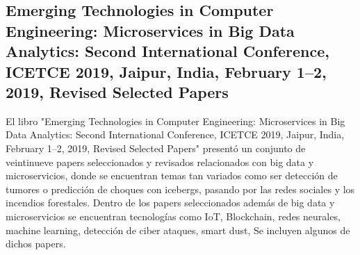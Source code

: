 \subsection{Emerging Technologies in Computer Engineering: Microservices in Big Data Analytics: Second International Conference, {ICETCE} 2019, Jaipur, India, February 1–2, 2019, Revised Selected Papers
}

El libro "Emerging Technologies in Computer Engineering: Microservices in Big Data Analytics: Second International Conference, {ICETCE} 2019, Jaipur, India, February 1–2, 2019, Revised Selected Papers"\cite{somaniEmerging2019} presentó un conjunto de veintinueve papers seleccionados y revisados relacionados con big data y microservicios,
donde se encuentran temas tan variados como ser detección de tumores o predicción de choques con icebergs, pasando por las redes sociales y los incendios forestales.
Dentro de los papers seleccionados además de big data y microservicios se encuentran tecnologías como IoT, Blockchain,
redes neurales, machine learning, detección de ciber ataques, smart dust,
Se incluyen algunos de dichos papers.\par







